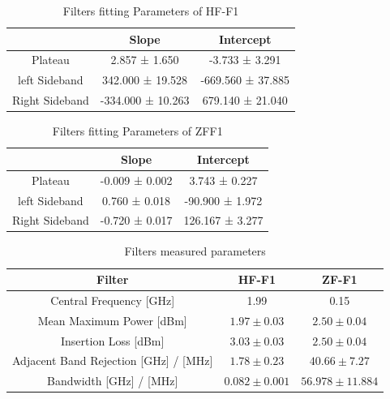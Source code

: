 \documentclass[12pt]{article}
\begin{document}
\begin{table}[H]
    \centering
    \caption{Filters fitting Parameters of HF-F1}
    \label{T2}
    \begin{tabular}{c |c |c }
        \hline
        \hline
         & Slope & Intercept  \\
        \hline
        Plateau & 2.857 ± 1.650 & -3.733 ± 3.291\\
        
        left Sideband & 342.000 ± 19.528 & -669.560 ± 37.885\\
        Right Sideband & -334.000 ± 10.263  & 679.140 ± 21.040 \\

        \hline
    \end{tabular}

\end{table}

\begin{table}[H]
    \centering
    \caption{Filters fitting Parameters of ZFF1}
    \label{T3}
    \begin{tabular}{c |c |c }
        \hline
        \hline
         & Slope & Intercept\\
        \hline
        Plateau & -0.009 ± 0.002 & 3.743 ± 0.227\\
        
        left Sideband & 0.760 ± 0.018 & -90.900 ± 1.972\\
        Right Sideband & -0.720 ± 0.017  & 126.167 ± 3.277 \\
        \hline
    \end{tabular}

\end{table}


\begin{table}[H]
    \centering
    \caption{Filters measured parameters}
    \label{T4}
    \begin{tabular}{c |c |c }
    
        \hline
        \hline
         Filter & HF-F1 & ZF-F1\\
        \hline
        Central Frequency [GHz] & 1.99  & 0.15\\ 
        Mean Maximum Power [dBm] & $1.97 \pm 0.03$ & $2.50 \pm 0.04$ \\
        Insertion Loss [dBm] &  $3.03 \pm 0.03$ & $2.50 \pm 0.04$ \\
        Adjacent Band Rejection [GHz] / [MHz]& $1.78 \pm 0.23$ & $40.66 \pm 7.27$\\ 
        Bandwidth [GHz] / [MHz]& $0.082\pm 0.001$ & $56.978 \pm 11.884$\\
        \hline

        \end{tabular}
\end{table}
\end{document}
